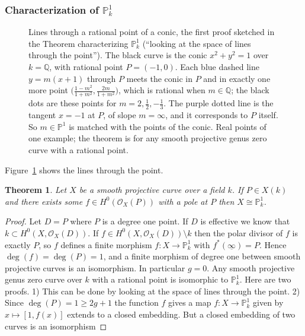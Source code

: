 \documentclass[12pt]{article}
\numberwithin{equation}{section}
\newtheorem{theorem}{Theorem}[subsection]
\theoremstyle{definition}
\theoremstyle{remark}
\newcommand{\QQ}{\mathbb{Q}}
\newcommand{\Ocal}{\mathcal{O}}
\newcommand{\PP}{\mathbb{P}}
\begin{document}
\subsubsection{Characterization of $\PP^1_k$}
\begin{figure}[H]
\centering

\caption{Lines through a rational point of a conic, the first proof sketched in the Theorem characterizing $\PP^1_k$ (``looking at the space of lines through the point''). The black curve is the conic $x^2+y^2=1$ over $k=\QQ$, with rational point $P=(-1,0)$. Each blue dashed line $y=m(x+1)$ through $P$ meets the conic in $P$ and in exactly one more point $\bigl(\frac{1-m^2}{1+m^2},\frac{2m}{1+m^2}\bigr)$, which is rational when $m\in\QQ$; the black dots are these points for $m=2,\tfrac12,-\tfrac13$. The purple dotted line is the tangent $x=-1$ at $P$, of slope $m=\infty$, and it corresponds to $P$ itself. So $m\in\PP^1$ is matched with the points of the conic. Real points of one example; the theorem is for any smooth projective genus zero curve with a rational point.}\label{fig:conic-lines-through-point}
\end{figure}
Figure~\ref{fig:conic-lines-through-point} shows the lines through the point.

\begin{theorem}
	Let $X$ be a smooth projective curve over a field $k$. 
	If $P\in X(k)$ and there exists some $f\in H^0(\Ocal_{X}(P))$ with a pole at $P$ then $X\cong \PP^1_k$. 
\end{theorem}
\begin{proof}
	Let $D = P$ where $P$ is a degree one point. 
	If $D$ is effective we know that $k \subset H^0(X,\Ocal_X(D))$. 
	If $f \in H^0(X,\Ocal_X(D))\setminus k$ then the polar divisor of $f$ is exactly $P$, so $f$ defines a finite morphism $f:X\to \PP^1_k$ with $f^*(\underline{\infty}) = P$. Hence $\deg(f)=\deg(P)=1$, and a finite morphism of degree one between smooth projective curves is an isomorphism. In particular $g=0$. 
	Any smooth projective genus zero curve over $k$ with a rational point is isomorphic to $\PP^1_k$.
	Here are two proofs.
	1) This can be done by looking at the space of lines through the point.
	2)  Since $\deg(P)=1\geq 2g+1$ the function $f$ gives a map $f:X\to\PP^1_k$ given by $x\mapsto [1,f(x)]$ extends to a closed embedding. But a closed embedding of two curves is an isomorphism
\end{proof}
\end{document}
